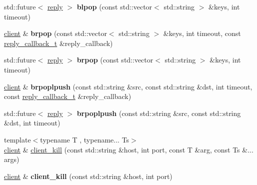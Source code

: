 \begin{DoxyCompactItemize}
\item 
\mbox{\label{classcpp__redis_1_1client_ac54c987bca4efb4bf6659b063f19d5ff}} 
std\+::future$<$ \hyperlink{classcpp__redis_1_1reply}{reply} $>$ {\bfseries blpop} (const std\+::vector$<$ std\+::string $>$ \&keys, int timeout)
\item 
\mbox{\label{classcpp__redis_1_1client_adc565332168e31ebbd762f2cb12ad4d1}} 
\hyperlink{classcpp__redis_1_1client}{client} \& {\bfseries brpop} (const std\+::vector$<$ std\+::string $>$ \&keys, int timeout, const \hyperlink{classcpp__redis_1_1client_a061a1140d36d2eaeda82b09a0bb3f9f2}{reply\+\_\+callback\+\_\+t} \&reply\+\_\+callback)
\item 
\mbox{\label{classcpp__redis_1_1client_aa123b931c6d00027d08f0fcbde2f026e}} 
std\+::future$<$ \hyperlink{classcpp__redis_1_1reply}{reply} $>$ {\bfseries brpop} (const std\+::vector$<$ std\+::string $>$ \&keys, int timeout)
\item 
\mbox{\label{classcpp__redis_1_1client_afa7fb97bb0b30c2c78a605f48b6144e2}} 
\hyperlink{classcpp__redis_1_1client}{client} \& {\bfseries brpoplpush} (const std\+::string \&src, const std\+::string \&dst, int timeout, const \hyperlink{classcpp__redis_1_1client_a061a1140d36d2eaeda82b09a0bb3f9f2}{reply\+\_\+callback\+\_\+t} \&reply\+\_\+callback)
\item 
\mbox{\label{classcpp__redis_1_1client_aa30b9303ee0d59b07dd656db2426547e}} 
std\+::future$<$ \hyperlink{classcpp__redis_1_1reply}{reply} $>$ {\bfseries brpoplpush} (const std\+::string \&src, const std\+::string \&dst, int timeout)
\item 
{\footnotesize template$<$typename T , typename... Ts$>$ }\\\hyperlink{classcpp__redis_1_1client}{client} \& \hyperlink{classcpp__redis_1_1client_ae4090830d1710276c33ff5a74eba2e4b}{client\+\_\+kill} (const std\+::string \&host, int port, const T \&arg, const Ts \&... args)
\item 
\mbox{\label{classcpp__redis_1_1client_a3163e1f29d65a5e7b0d4165be154fb96}} 
\hyperlink{classcpp__redis_1_1client}{client} \& {\bfseries client\+\_\+kill} (const std\+::string \&host, int port)

\end{DoxyCompactItemize}
